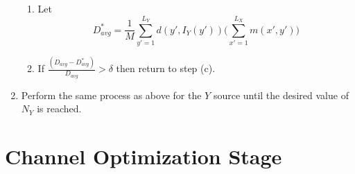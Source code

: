 \documentclass[10pt]{article}
\begin{document}
\begin{enumerate}
\begin{enumerate}
            \item Let 
                \begin{equation*}
                    D^*_{avg} = \frac{1}{M} \sum_{y'=1}^{L_Y}
                    d(y',I_Y(y')) \Big(\sum_{x'=1}^{L_X} m(x',y')\Big)
                \end{equation*}

            \item If
                $\frac
                {(D_{avg} - D^*_{avg})}
                {D_{avg}}
                > \delta$
                then return to step (c).
        \end{enumerate}

    \item Perform the same process as above for the $Y$ source until the
        desired value of $N_Y$ is reached.

\end{enumerate}

\section*{Channel Optimization Stage}
\end{document}
